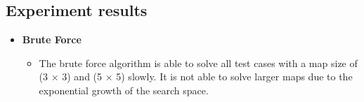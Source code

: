 \subsection{Experiment results}
\begin{flushleft}
    \begin{itemize}
        \item \textbf{Brute Force}
              \begin{flushleft}
                  \begin{itemize}
                      \item The brute force algorithm is able to solve all test cases with a map size of (3 × 3) and (5 × 5) slowly. It is not able to solve larger maps due to the exponential growth of the search space.
                  \end{itemize}


\end{flushleft}
\end{itemize}
\end{flushleft}
